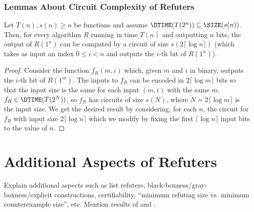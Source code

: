 \subsubsection{Lemmas About Circuit Complexity of Refuters}



\begin{lemma}
	\label{lem:circuitbinarytounary}
	Let $T(n), s(n) \geq n$ be functions and assume $\DTIME(T(2^n)) \subseteq \SIZE(s(n))$. 
	Then, for every algorithm $R$ running in time $T(n)$ and outputting $n$ bits,
	the output of $R(1^n)$ can be computed by a circuit of size $s(2 \lceil \log n \rceil)$ 
	(which takes as input an index $0 \leq i < n$ and outputs the $i$-th bit of $R(1^n)$).
\end{lemma}
\begin{proof}
Consider the function $f_R(m, i)$ which, given $m$ and $i$ in binary, outputs the $i$-th bit of $R(1^m)$. The inputs to $f_R$ can 
be encoded in $2 \lceil \log m \rceil$ bits so that the input size is the same for each input $(m, i)$ with the same $m$.
$f_R \in \DTIME(T(2^N))$, so $f_R$ has circuits of size $s(N)$, where $N = 2 \lceil \log m \rceil$ is the input size. 
We get the desired result by considering, for each $n$, the circuit for $f_R$ with input size $2 \lceil \log n \rceil$
which we modify by fixing the first $\lceil \log n \rceil$ input 
bits to the value of $n$. 
\end{proof}

\section{Additional Aspects of Refuters}

Explain additional aspects such as list refuters, black-boxness/gray-boxness/explicit constructions, certifiability, ``minimum refuting size vs. minimum counterexample size'', etc.
Mention results of \cite{Atserias06} and \cite{Bogdanov10}. 


